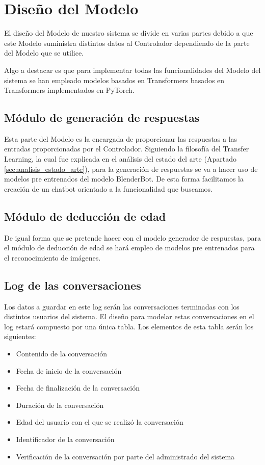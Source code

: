 \section{Diseño del Modelo}

El diseño del Modelo de nuestro sistema se divide en varias partes debido a que este Modelo suministra distintos datos al Controlador dependiendo de la parte del Modelo que se utilice.

Algo a destacar es que para implementar todas las funcionalidades del Modelo del sistema se han empleado modelos basados en \gls{Transformers} basados en \gls{Transformers} implementados en \gls{PyTorch}.

\subsection*{Módulo de generación de respuestas}

Esta parte del Modelo es la encargada de proporcionar las respuestas a las entradas proporcionadas por el Controlador. Siguiendo la filosofía del Transfer Learning, la cual fue explicada en el análisis del estado del arte (Apartado \ref{sec:analisis_estado_arte}), para la generación de respuestas se va a hacer uso de modelos pre entrenados del modelo BlenderBot. De esta forma facilitamos la creación de un chatbot orientado a la funcionalidad que buscamos.

\subsection*{Módulo de deducción de edad}

De igual forma que se pretende hacer con el modelo generador de respuestas, para el módulo de deducción de edad se hará empleo de modelos pre entrenados para el reconocimiento de imágenes.

\subsection*{Log de las conversaciones}

Los datos a guardar en este log serán las conversaciones terminadas con los distintos usuarios del sistema. El diseño para modelar estas conversaciones en el log estará compuesto por una única tabla. Los elementos de esta tabla serán los siguientes:

\begin{itemize}
\item Contenido de la conversación
\item Fecha de inicio de la conversación
\item Fecha de finalización de la conversación
\item Duración de la conversación
\item Edad del usuario con el que se realizó la conversación
\item Identificador de la conversación
\item Verificación de la conversación por parte del administrado del sistema
\end{itemize}

